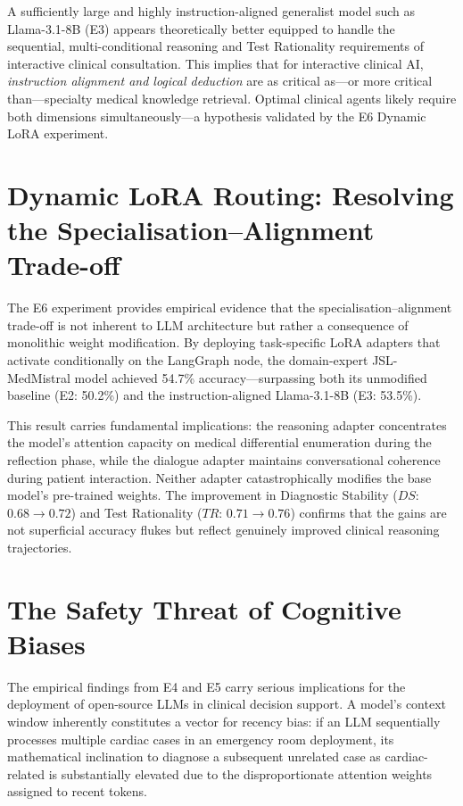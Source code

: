 A sufficiently large and highly instruction-aligned generalist model such as Llama-3.1-8B (E3) appears theoretically better equipped to handle the sequential, multi-conditional reasoning and Test Rationality requirements of interactive clinical consultation. This implies that for interactive clinical AI, \textit{instruction alignment and logical deduction} are as critical as---or more critical than---specialty medical knowledge retrieval. Optimal clinical agents likely require both dimensions simultaneously---a hypothesis validated by the E6 Dynamic LoRA experiment.

\section{Dynamic LoRA Routing: Resolving the Specialisation--Alignment Trade-off}

The E6 experiment provides empirical evidence that the specialisation--alignment trade-off is not inherent to LLM architecture but rather a consequence of monolithic weight modification. By deploying task-specific LoRA adapters that activate conditionally on the LangGraph node, the domain-expert JSL-MedMistral model achieved 54.7\% accuracy---surpassing both its unmodified baseline (E2: 50.2\%) and the instruction-aligned Llama-3.1-8B (E3: 53.5\%).

This result carries fundamental implications: the reasoning adapter concentrates the model's attention capacity on medical differential enumeration during the reflection phase, while the dialogue adapter maintains conversational coherence during patient interaction. Neither adapter catastrophically modifies the base model's pre-trained weights. The improvement in Diagnostic Stability ($DS$: $0.68 \to 0.72$) and Test Rationality ($TR$: $0.71 \to 0.76$) confirms that the gains are not superficial accuracy flukes but reflect genuinely improved clinical reasoning trajectories.

\section{The Safety Threat of Cognitive Biases}

The empirical findings from E4 and E5 carry serious implications for the deployment of open-source LLMs in clinical decision support. A model's context window inherently constitutes a vector for recency bias: if an LLM sequentially processes multiple cardiac cases in an emergency room deployment, its mathematical inclination to diagnose a subsequent unrelated case as cardiac-related is substantially elevated due to the disproportionate attention weights assigned to recent tokens.

